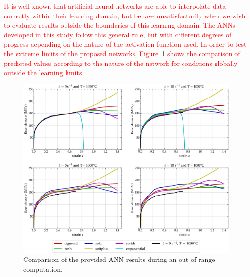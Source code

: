 \documentclass[algorithms,article,submit,pdftex,oneauthors]{Definitions/mdpi}
\begin{document}
\textcolor{red}{It is well known that artificial neural networks are able to interpolate data correctly within their learning domain, but behave unsatisfactorily when we wish to evaluate results outside the boundaries of this learning domain.
The ANNs developed in this study follow this general rule, but with different degrees of progress depending on the nature of the activation function used.
In order to test the extreme limits of the proposed networks, Figure~\ref{fig:ANN-Extrapolation} shows the comparison of predicted values according to the nature of the network for conditions globally outside the learning limits.}
\begin{figure}[h!]
\centering
\includegraphics[width=0.95\columnwidth]{Figures/Extrapolation}
\caption{Comparison of the provided ANN results during an out of range computation.}
\label{fig:ANN-Extrapolation}
\end{figure}
\end{document}

